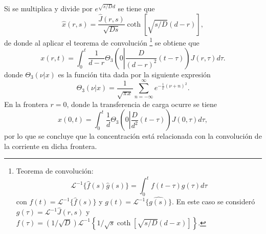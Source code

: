 Si se multiplica y divide por $e^{\sqrt{s/D}d}$ se tiene que
\begin{equation}
    \hat{x}(r, s) = \frac{\hat{J}(r, s)}{\sqrt{Ds}} \coth{[\sqrt{s/D} (d - r)]},
\end{equation}
de donde al aplicar el teorema de convolución 
\footnote{Teorema de convolución:
    \begin{equation}
        \mathcal{L}^{-1} \{\hat{f}(s)\hat{g}(s)\} = \int_0^t f(t - \tau) g(\tau) d\tau
    \end{equation}
    con $f(t) = \mathcal{L}^{-1}\{\hat{f}(s)\}$ y $g(t) = \mathcal{L}^{-1}\{\hat{g(s)}\}$.
    En este caso se consideró $g(\tau) = \mathcal{L}^{-1}\hat{J}(r, s)$
    y $f(\tau) = (1/\sqrt{D}) \mathcal{L}^{-1} \left\{ 1/\sqrt{s} \coth{[\sqrt{s/D}(d-x)]}\right\}$.
} 
se obtiene que
\begin{equation}
    x(r, t) = \int_0^t \frac{1}{d - r} \Theta_3\left(0 \left|\frac{D}{(d-r)^2} (t - \tau)\right.\right) J(r, \tau) d\tau.
\end{equation}
donde $\Theta_3(\nu|x)$ es la función tita \cite{bieniasz2015} dada por la 
siguiente expresión
\begin{equation}
    \Theta_3(\nu|x) = \frac{1}{\sqrt{\pi x}} \sum_{n=-\infty}^{\infty} e^{-\frac{1}{x}(\nu + n)^2}.
\end{equation}
En la frontera $r = 0$, donde la transferencia de carga ocurre se tiene
\begin{equation}\label{eq:rel1}
    x(0, t) = \int_0^t \frac{1}{d} \Theta_3\left(0 \left|\frac{D}{d^2} (t - \tau)\right.\right) J(0, \tau) d\tau,
\end{equation}
por lo que se concluye que la concentración está relacionada con la convolución 
de la corriente en dicha frontera.

